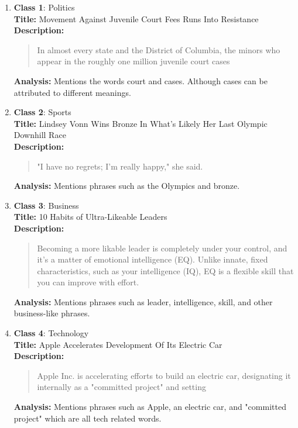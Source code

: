 \documentclass[letterpaper,conference,compsoc,onecolumn]{IEEEtran}
\begin{document}
\begin{enumerate}
    \item \textbf{Class 1}: Politics\\
    \textbf{Title:} Movement Against Juvenile Court Fees Runs Into Resistance\\
    \textbf{Description:}
    \begin{quote}
        \small
        In almost every state and the District of Columbia, the minors who
        appear in the roughly one million juvenile court cases
    \end{quote}
    \textbf{Analysis:} Mentions the words court and cases. Although cases can be attributed to different meanings.

    \item \textbf{Class 2}: Sports\\
    \textbf{Title:} Lindsey Vonn Wins Bronze In What's Likely Her Last Olympic
    Downhill Race\\
    \textbf{Description:}
    \begin{quote}
        \small
        "I have no regrets; I'm really happy," she said.
    \end{quote}
    \textbf{Analysis:} Mentions phrases such as the Olympics and bronze.

    \item \textbf{Class 3}: Business\\
    \textbf{Title:} 10 Habits of Ultra-Likeable Leaders\\
    \textbf{Description:}
    \begin{quote}
        \small
        Becoming a more likable leader is completely under your control, and it's a matter of emotional intelligence (EQ). Unlike innate, fixed characteristics, such as your intelligence (IQ), EQ is a flexible skill that you can improve with effort.
    \end{quote}
    \textbf{Analysis:} Mentions phrases such as leader, intelligence, skill, and other business-like phrases.

    \item \textbf{Class 4}: Technology\\
    \textbf{Title:} Apple Accelerates Development Of Its Electric Car\\
    \textbf{Description:}
    \begin{quote}
        \small
        Apple Inc. is accelerating efforts to build an electric car, designating it internally as a "committed project" and setting
    \end{quote}
    \textbf{Analysis:} Mentions phrases such as Apple, an electric car, and "committed project" which are all tech related words.


\end{enumerate}
\end{document}
